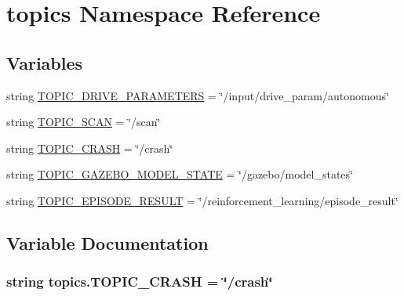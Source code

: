 \hypertarget{namespacetopics}{}\section{topics Namespace Reference}
\label{namespacetopics}
\subsection*{Variables}
\begin{DoxyCompactItemize}
\item 
string \hyperlink{namespacetopics_aa8a3d8ee1bd4559d446bceb3f6c97344}{T\+O\+P\+I\+C\+\_\+\+D\+R\+I\+V\+E\+\_\+\+P\+A\+R\+A\+M\+E\+T\+E\+RS} = \char`\"{}/input/drive\+\_\+param/autonomous\char`\"{}
\item 
string \hyperlink{namespacetopics_ac80f7b07b167f46456612250e91dda20}{T\+O\+P\+I\+C\+\_\+\+S\+C\+AN} = \char`\"{}/scan\char`\"{}
\item 
string \hyperlink{namespacetopics_a5249c8757b54f9d21e243771a62e3765}{T\+O\+P\+I\+C\+\_\+\+C\+R\+A\+SH} = \char`\"{}/crash\char`\"{}
\item 
string \hyperlink{namespacetopics_a776b6454a1d4d1538991cbca9540aab6}{T\+O\+P\+I\+C\+\_\+\+G\+A\+Z\+E\+B\+O\+\_\+\+M\+O\+D\+E\+L\+\_\+\+S\+T\+A\+TE} = \char`\"{}/gazebo/model\+\_\+states\char`\"{}
\item 
string \hyperlink{namespacetopics_a16a444b7aadcb1fc5a83c7092978dd7e}{T\+O\+P\+I\+C\+\_\+\+E\+P\+I\+S\+O\+D\+E\+\_\+\+R\+E\+S\+U\+LT} = \char`\"{}/reinforcement\+\_\+learning/episode\+\_\+result\char`\"{}
\end{DoxyCompactItemize}


\subsection{Variable Documentation}
\subsubsection[{\texorpdfstring{T\+O\+P\+I\+C\+\_\+\+C\+R\+A\+SH}{TOPIC_CRASH}}]{\setlength{\rightskip}{0pt plus 5cm}string topics.\+T\+O\+P\+I\+C\+\_\+\+C\+R\+A\+SH = \char`\"{}/crash\char`\"{}}\hypertarget{namespacetopics_a5249c8757b54f9d21e243771a62e3765}{}\label{namespacetopics_a5249c8757b54f9d21e243771a62e3765}



